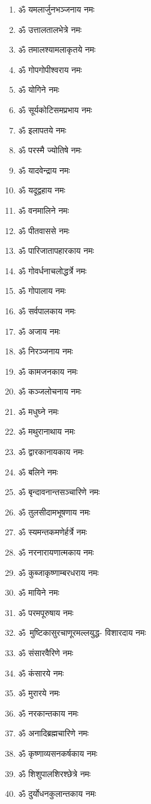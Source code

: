 \begin{multicols}{2}
\begin{enumerate}
\item ॐ यमलार्जुनभञ्जनाय नमः
\item ॐ उत्तालतालभेत्रे नमः
\item ॐ तमालश्यामलाकृतये नमः
\item ॐ गोपगोपीश्वराय नमः
\item ॐ योगिने नमः
\item ॐ सूर्यकोटिसमप्रभाय नमः
\item ॐ इलापतये नमः
\item ॐ परस्मै ज्योतिषे नमः
\item ॐ यादवेन्द्राय नमः
\item ॐ यदूद्वहाय नमः
\item ॐ वनमालिने नमः
\item ॐ पीतवाससे नमः
\item ॐ पारिजातापहारकाय नमः
\item ॐ गोवर्धनाचलोद्धर्त्रे नमः
\item ॐ गोपालाय नमः
\item ॐ सर्वपालकाय नमः
\item ॐ अजाय नमः
\item ॐ निरञ्जनाय नमः
\item ॐ कामजनकाय नमः
\item ॐ कञ्जलोचनाय नमः
\item ॐ मधुघ्ने नमः
\item ॐ मथुरानाथाय नमः
\item ॐ द्वारकानायकाय नमः
\item ॐ बलिने नमः
\item ॐ बृन्दावनान्तसञ्चारिणे नमः
\item ॐ तुलसीदामभूषणाय नमः
\item ॐ स्यमन्तकमणेर्हर्त्रे नमः
\item ॐ नरनारायणात्मकाय नमः
\item ॐ कुब्जाकृष्णाम्बरधराय नमः
\item ॐ मायिने नमः
\item ॐ परमपूरुषाय नमः
\item \mbox{ॐ~मुष्टिकासुरचाणूरमल्लयुद्ध-} विशारदाय नमः
\item ॐ संसारवैरिणे नमः
\item ॐ कंसारये नमः
\item ॐ मुरारये नमः
\item ॐ नरकान्तकाय नमः
\item ॐ अनादिब्रह्मचारिणे नमः
\item ॐ कृष्णाव्यसनकर्षकाय नमः
\item ॐ शिशुपालशिरश्छेत्रे नमः
\item ॐ  दुर्योधनकुलान्तकाय नमः

\end{enumerate}
\end{multicols}
